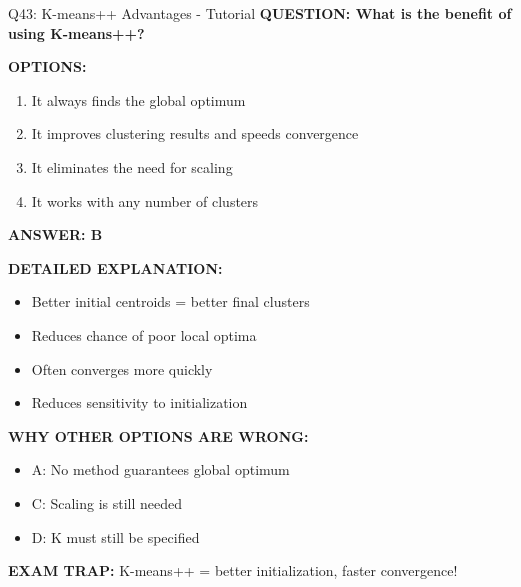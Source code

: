 \documentclass[8pt]{beamer}
\begin{document}
	\begin{frame}{Q43: K-means++ Advantages - Tutorial}
		\fontsize{6.5}{7.5}\selectfont
		\textbf{QUESTION: What is the benefit of using K-means++?}
		
		\vspace{0.1cm}
		\textbf{OPTIONS:}
		\begin{enumerate}
			\item It always finds the global optimum
			\item It improves clustering results and speeds convergence
			\item It eliminates the need for scaling
			\item It works with any number of clusters
		\end{enumerate}
		
		\vspace{0.1cm}
		\textcolor{myblue}{\textbf{ANSWER: B}}
		
		\vspace{0.1cm}
		\textbf{DETAILED EXPLANATION:}
		\begin{itemize}
			\item Better initial centroids = better final clusters
			\item Reduces chance of poor local optima
			\item Often converges more quickly
			\item Reduces sensitivity to initialization
		\end{itemize}
		
		\vspace{0.1cm}
		\textcolor{myred}{\textbf{WHY OTHER OPTIONS ARE WRONG:}}
		\begin{itemize}
			\item \textcolor{myred}{A:} No method guarantees global optimum
			\item \textcolor{myred}{C:} Scaling is still needed
			\item \textcolor{myred}{D:} K must still be specified
		\end{itemize}
		
		\textcolor{myred}{\textbf{EXAM TRAP:}} K-means++ = \textcolor{myblue}{better initialization, faster convergence}!
	\end{frame}
	
\end{document}
